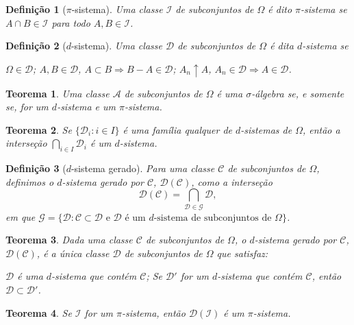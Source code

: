 \documentclass[12pt,a4paper,answers]{article}
\numberwithin{equation}{section} %
\newcommand{\Acal}{\mathcal{A}}
\newcommand{\Ccal}{\mathcal{C}}
\newcommand{\Dcal}{\mathcal{D}}
\newcommand{\Gcal}{\mathcal{G}}
\newcommand{\Ical}{\mathcal{I}}
\theoremstyle{thm_estilo}
\newtheorem{theorem}{Teorema}[section]
\newtheorem{definition}{Definição}[section]
\theoremstyle{thm_note_est}
\begin{document}
\begin{definition}[$\pi$-sistema]
	Uma classe $\Ical$ de subconjuntos de $\Omega$ é dito $\pi$-sistema se $A \cap B \in \Ical$ para todo $A, B \in \Ical$.
\end{definition}

\begin{definition}[$d$-sistema]
	Uma classe $\Dcal$ de subconjuntos de $\Omega$ é dita $d$-sistema se
	\begin{outline}[enumerate]
		\1 $\Omega \in \Dcal$;
		\1 $A, B \in \Dcal$, $A \subset B \Rightarrow B - A \in \Dcal$;
		\1 $A_n \uparrow A$, $A_n \in \Dcal \Rightarrow A \in \Dcal$.
	\end{outline}
\end{definition}

\begin{theorem}
	Uma classe $\Acal$ de subconjuntos de $\Omega$ é uma $\sigma$-álgebra se, e somente se, for um $d$-sistema e um $\pi$-sistema.
\end{theorem}

\begin{theorem}
	Se $\{\Dcal_i : i \in I\}$ é uma família qualquer de $d$-sistemas de $\Omega$, então a interseção $\bigcap_{i \in I} \Dcal_i$ é um $d$-sistema.
\end{theorem}

\begin{definition}[$d$-sistema gerado]
	Para uma classe $\Ccal$ de subconjuntos de $\Omega$, definimos o $d$-sistema gerado por $\Ccal$, $\Dcal(\Ccal)$, como a interseção
	\[
	\Dcal(\Ccal) = \bigcap_{\Dcal \in \Gcal} \Dcal,
	\]
	em que $\Gcal = \{\Dcal : \Ccal \subset \Dcal \text{ e } \Dcal \text{ é um } d\text{-sistema de subconjuntos de } \Omega\}$.
\end{definition}

\begin{theorem}
	Dada uma classe $\Ccal$ de subconjuntos de $\Omega$, o $d$-sistema gerado por $\Ccal$, $\Dcal(\Ccal)$, é a única classe $\Dcal$ de subconjuntos de $\Omega$ que satisfaz:
	\begin{outline}[enumerate]
		\1 $\Dcal$ é uma $d$-sistema que contém $\Ccal$;
		\1 Se $\Dcal'$ for um $d$-sistema que contém $\Ccal$, então $\Dcal \subset \Dcal'$.
	\end{outline}
\end{theorem}

\begin{theorem}
	Se $\Ical$ for um $\pi$-sistema, então $\Dcal(\Ical)$ é um $\pi$-sistema.
\end{theorem}
\end{document}
